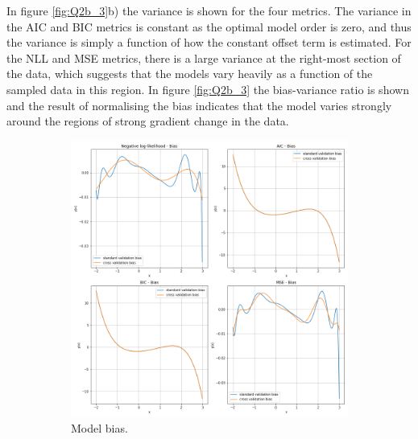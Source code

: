 \documentclass{article}
\begin{document}
In figure \ref{fig:Q2b_3}b) the variance is shown for the four metrics. The variance in the AIC and BIC metrics is constant as the optimal model order is zero, and thus the variance is simply a function of how the constant offset term is estimated. For the NLL and MSE metrics, there is a large variance at the right-most section of the data, which suggests that the models vary heavily as a function of the sampled data in this region. In figure \ref{fig:Q2b_3} the bias-variance ratio is shown and the result of normalising the bias indicates that the model varies strongly around the regions of strong gradient change in the data.

\begin{figure}[!htb]
     \centering
     \begin{subfigure}[b]{0.45\textwidth}
         \centering
         \includegraphics[width=\textwidth]{Q2b_fig3.png}
         \caption{Model bias.}
     \end{subfigure}
     \hfill
     \begin{subfigure}[b]{0.45\textwidth}
         \centering

\end{subfigure}
\end{figure}
\end{document}
